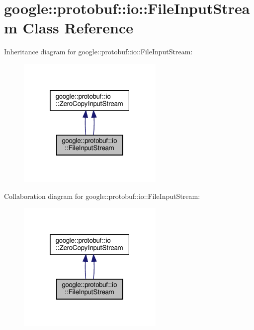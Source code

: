 \hypertarget{classgoogle_1_1protobuf_1_1io_1_1FileInputStream}{}\section{google\+:\+:protobuf\+:\+:io\+:\+:File\+Input\+Stream Class Reference}
\label{classgoogle_1_1protobuf_1_1io_1_1FileInputStream}


Inheritance diagram for google\+:\+:protobuf\+:\+:io\+:\+:File\+Input\+Stream\+:
\nopagebreak
\begin{figure}[H]
\begin{center}
\leavevmode
\includegraphics[width=199pt]{classgoogle_1_1protobuf_1_1io_1_1FileInputStream__inherit__graph}
\end{center}
\end{figure}


Collaboration diagram for google\+:\+:protobuf\+:\+:io\+:\+:File\+Input\+Stream\+:
\nopagebreak
\begin{figure}[H]
\begin{center}
\leavevmode
\includegraphics[width=199pt]{classgoogle_1_1protobuf_1_1io_1_1FileInputStream__coll__graph}
\end{center}
\end{figure}
